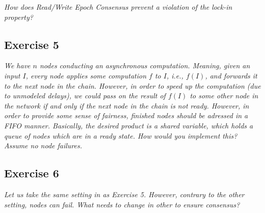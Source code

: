 \emph{How does Read/Write Epoch Consensus prevent a violation of the lock-in property?}

\subsection*{Exercise 5}
\label{sec:exercise_5}

\emph{We have $n$ nodes conducting an asynchronous computation. Meaning, given an input $I$, every node applies some computation $f$ to $I$, i.e., $f(I)$, and forwards it to the next node in the chain. However, in order to speed up the computation (due to unmodeled delays), we could pass on the result of $f(I)$ to some other node in the network if and only if the next node in the chain is not ready. However, in order to provide some sense of fairness, finished nodes should be adressed in a FIFO manner. Basically, the desired product is a shared variable, which holds a queue of nodes which are in a ready state. How would you implement this? Assume no node failures.}

\subsection*{Exercise 6}
\label{sec:exercise_6}

\emph{Let us take the same setting in as Exercise 5. However, contrary to the other setting, nodes can fail. What needs to change in other to ensure consensus?}


